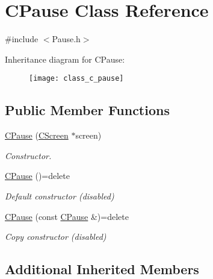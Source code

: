 \hypertarget{class_c_pause}{}\section{C\+Pause Class Reference}
\label{class_c_pause}


{\ttfamily \#include $<$Pause.\+h$>$}

Inheritance diagram for C\+Pause\+:\begin{figure}[H]
\begin{center}
\leavevmode
\texttt{[image: class\_c\_pause]}
\end{center}
\end{figure}
\subsection*{Public Member Functions}
\begin{DoxyCompactItemize}
\item 
\mbox{\hyperlink{class_c_pause_af2fd743348426c540c4bb284865b63c4}{C\+Pause}} (\mbox{\hyperlink{class_c_screen}{C\+Screen}} $\ast$screen)
\begin{DoxyCompactList}\small\item\em Constructor. \end{DoxyCompactList}\item 
\mbox{\label{class_c_pause_ac9232d79a7612d4d0169dc42e9aa2d38}} 
\mbox{\hyperlink{class_c_pause_ac9232d79a7612d4d0169dc42e9aa2d38}{C\+Pause}} ()=delete
\begin{DoxyCompactList}\small\item\em Default constructor (disabled) \end{DoxyCompactList}\item 
\mbox{\label{class_c_pause_aa0d0b143d6a03db359cdd4ce6da2b6a9}} 
\mbox{\hyperlink{class_c_pause_aa0d0b143d6a03db359cdd4ce6da2b6a9}{C\+Pause}} (const \mbox{\hyperlink{class_c_pause}{C\+Pause}} \&)=delete
\begin{DoxyCompactList}\small\item\em Copy constructor (disabled) \end{DoxyCompactList}\end{DoxyCompactItemize}
\subsection*{Additional Inherited Members}


